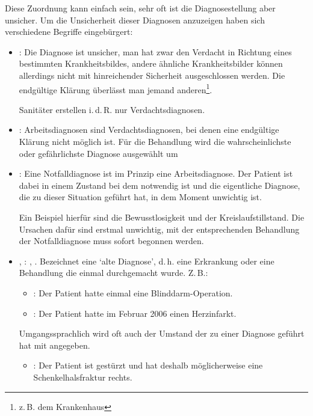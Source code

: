 {Diese Zuordnung kann einfach sein, sehr oft ist die Diagnosestellung
aber unsicher. Um die Unsicherheit dieser Diagnosen
anzuzeigen haben sich verschiedene Begriffe eingebürgert: 

\begin{itemize}
    \item {}: 
    Die Diagnose ist unsicher, man hat zwar den Verdacht in
    Richtung  eines bestimmten Krankheitsbildes, andere
    ähnliche Krankheitsbilder können  allerdings nicht mit
    hinreichender Sicherheit ausgeschlossen werden. Die
    endgültige Klärung überlässt man jemand
    anderen\footnote{z.\,B. dem Krankenhaus}. \par Sanitäter
    erstellen i.\,d.\,R. nur Verdachtsdiagnosen.
     
    \item {}: 
    Arbeitsdiagnosen sind Verdachtsdiagnosen, bei denen eine
    endgültige Klärung nicht  möglich ist. Für die
    Behandlung wird die wahrscheinlichste oder gefährlichste
    Diagnose ausgewählt um 
    \item {}: Eine
    Notfalldiagnose ist im Prinzip eine Arbeitsdiagnose. Der Patient ist dabei 
    in einem Zustand bei dem  notwendig ist und die 
    eigentliche Diagnose, die zu dieser Situation geführt hat, in dem Moment 
    unwichtig ist. 
    \par Ein Beispiel hierfür sind die Bewusstlosigkeit und der
    Kreislaufstillstand. Die Ursachen dafür sind erstmal unwichtig, mit der
    entsprechenden Behandlung der Notfalldiagnose muss sofort begonnen werden.
    \item {},  :
     
    , . Bezeichnet eine
    \enquote*{alte Diagnose}, d.\,h. eine Erkrankung oder eine Behandlung
    die einmal durchgemacht wurde. Z.\,B.:
    \begin{itemize}
        \item {}: Der Patient
        hatte einmal eine Blinddarm-Operation.
        \item {}: Der Patient
        hatte im Februar 2006 einen Herzinfarkt.
    \end{itemize}
    Umgangssprachlich wird oft auch der Umstand der zu einer
    Diagnose geführt hat mit 
    angegeben.
    \begin{itemize}
        \item {}: Der
        Patient ist gestürzt und hat deshalb möglicherweise eine
        Schenkelhalsfraktur rechts.
    \end{itemize}
\end{itemize}}
